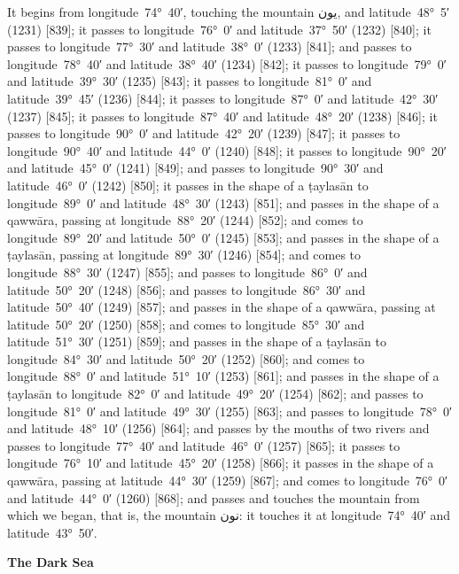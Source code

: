 \documentclass[11pt]{article}
\newcommand{\Pg}[1]{\marginpar{\footnotesize #1}}
\begin{document}
It begins from longitude~74°~40′, touching the mountain \textarabic{يون}, and latitude~48°~5′ (1231) [839]; it passes to longitude~76°~0′ and latitude~37°~50′ (1232) [840]; it passes to longitude~77°~30′ and latitude~38°~0′ (1233) [841]; and passes to longitude~78°~40′ and latitude~38°~40′ (1234) [842]; it passes to longitude~79°~0′ and latitude~39°~30′ (1235) [843]; it passes to longitude~81°~0′ and latitude~39°~45′ (1236) [844]; it passes to longitude~87°~0′ and latitude~42°~30′ (1237) [845]; it passes to longitude~87°~40′ and latitude~48°~20′ (1238) [846]; it passes to longitude~90°~0′ and latitude~42°~20′ (1239) [847]\Pg{p. 81}; it passes to longitude~90°~40′ and latitude~44°~0′ (1240) [848]; it passes to longitude~90°~20′ and latitude~45°~0′ (1241) [849]; and passes to longitude~90°~30′ and latitude~46°~0′ (1242) [850]; it passes in the shape of a ṭaylasān to longitude~89°~0′ and latitude~48°~30′ (1243) [851]; and passes in the shape of a qawwāra, passing at longitude~88°~20′ (1244) [852]; and comes to longitude~89°~20′ and latitude~50°~0′ (1245) [853]; and passes in the shape of a ṭaylasān, passing at longitude~89°~30′ (1246) [854]; and comes to longitude~88°~30′ (1247) [855]; and passes to longitude~86°~0′ and latitude~50°~20′ (1248) [856]; and passes to longitude~86°~30′ and latitude~50°~40′ (1249) [857]; and passes in the shape of a qawwāra, passing at latitude~50°~20′ (1250) [858]; and comes to longitude~85°~30′ and latitude~51°~30′ (1251) [859]; and passes in the shape of a ṭaylasān to longitude~84°~30′ and latitude~50°~20′ (1252) [860]; and comes to longitude~88°~0′ and latitude~51°~10′ (1253) [861]; and passes in the shape of a ṭaylasān to longitude~82°~0′ and latitude~49°~20′ (1254) [862]; and passes to longitude~81°~0′ and latitude~49°~30′ (1255) [863]; and passes to longitude~78°~0′ and latitude~48°~10′ (1256) [864]; and passes by the mouths of two rivers and passes to longitude~77°~40′ and latitude~46°~0′ (1257) [865]; it passes to longitude~76°~10′ and latitude~45°~20′ (1258) [866]; it passes in the shape of a qawwāra, passing at latitude~44°~30′ (1259) [867]; and comes to longitude~76°~0′ and latitude~44°~0′ (1260) [868]; and passes and touches the mountain from which we began, that is, the mountain \textarabic{نون}: it touches it at longitude~74°~40′ and latitude~43°~50′.

\par\medskip\begin{center}\Pg{p. 82}\bfseries The Dark Sea\end{center}\par
\end{document}
